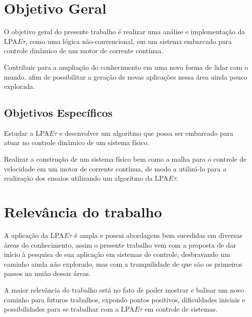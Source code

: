 



\section{Objetivo Geral}

O objetivo geral do presente trabalho é realizar uma análise e implementação da LPA$E\tau$, como uma lógica não-convencional, em um sistema embarcado para controle dinâmico de um motor de corrente contínua.


Contribuir para a ampliação do conhecimento em uma nova forma de lidar com o mundo, afim de possibilitar a geração de novas aplicações nessa área ainda pouco explorada. 




\subsection{Objetivos Específicos}

Estudar a LPA$E\tau$ e desenvolver um algoritmo 
que possa ser embarcado para 
atuar no controle dinâmico de um sistema físico.


Realizar a construção de um sistema físico bem como a malha para 
o controle de velocidade em um motor de corrente contínua, 
de modo a utilizá-lo para a realização dos ensaios utilizando um
algorítmo da LPA$E\tau$.




\section{Relevância do trabalho}

A aplicação da LPA$E\tau$ é ampla e possui abordagens bem sucedidas em
diversas áreas do conhecimento, assim o presente trabalho vem com a
proposta de dar início à pesquisa de sua aplicação em
sistemas de controle, desbravando um caminho ainda não explorado,
mas com a tranquilidade de que são os primeiros passos na união dessas
áreas.

A maior relevância do trabalho está no fato de poder mostrar e balisar
um novo caminho para futuros trabalhos, expondo pontos positivos, dificuldades
iniciais e possibilidades para se trabalhar com a LPA$E\tau$ em
controle de sistemas.




